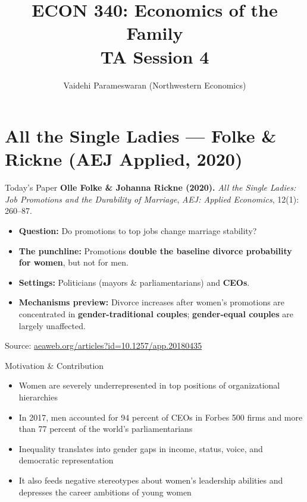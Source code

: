\documentclass[11pt,notes=hide,aspectratio=169,mathserif]{beamer}
\title[class]{ECON 340: Economics of the Family \\ TA Session 4}
\author[Vaidehi's class]{Vaidehi Parameswaran (Northwestern Economics)}
\date{\monthname[\the\month] \the\year}
\begin{document}
\begin{frame}[plain]
\titlepage
\end{frame}


\section{All the Single Ladies — Folke \& Rickne (AEJ Applied, 2020)}

\begin{frame}{Today's Paper}
\small
\textbf{Olle Folke \& Johanna Rickne (2020).} \emph{All the Single Ladies: Job Promotions and the Durability of Marriage}, \textit{AEJ: Applied Economics}, 12(1): 260–87.\\[0.6em]
\begin{itemize}
  \item \textbf{Question:} Do promotions to top jobs change marriage stability? 
  \item \textbf{The punchline:} Promotions \textbf{double the baseline divorce probability for women}, but not for men. 
  \item \textbf{Settings:} Politicians (mayors \& parliamentarians) and \textbf{CEOs}. 
  \item \textbf{Mechanisms preview:} Divorce increases after women’s promotions are concentrated in \textbf{gender-traditional couples}; \textbf{gender-equal couples} are largely unaffected. 
\end{itemize}
{\footnotesize Source: \href{https://www.aeaweb.org/articles?id=10.1257/app.20180435}{aeaweb.org/articles?id=10.1257/app.20180435}}
\end{frame}

\begin{frame}{Motivation \& Contribution}
\small
\begin{itemize}
  \item Women are severely underrepresented in top positions of organizational hierarchies
  \item In 2017, men accounted for 94 percent of CEOs in Forbes 500 firms and more than 77 percent of the world’s parliamentarians
  \item Inequality translates into gender gaps in income, status, voice, and democratic representation 
  \item It also feeds negative stereotypes about women’s leadership abilities and depresses the career ambitions of young women
\end{itemize}
\end{frame}
\end{document}
